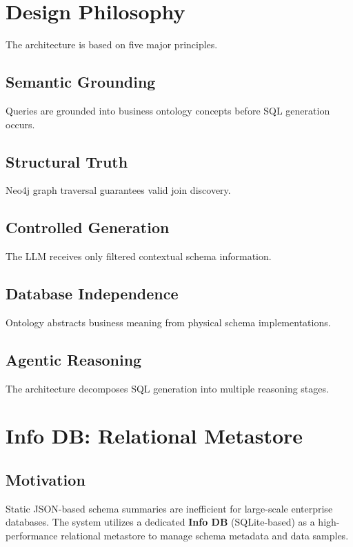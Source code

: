 \documentclass[11pt,a4paper]{article}
\begin{document}
\section{Design Philosophy}

The architecture is based on five major principles.

\subsection{Semantic Grounding}

Queries are grounded into business ontology concepts before SQL generation occurs.

\subsection{Structural Truth}

Neo4j graph traversal guarantees valid join discovery.

\subsection{Controlled Generation}

The LLM receives only filtered contextual schema information.

\subsection{Database Independence}

Ontology abstracts business meaning from physical schema implementations.

\subsection{Agentic Reasoning}

The architecture decomposes SQL generation into multiple reasoning stages.

\section{Info DB: Relational Metastore}

\subsection{Motivation}

Static JSON-based schema summaries are inefficient for large-scale enterprise databases. The system utilizes a dedicated \textbf{Info DB} (SQLite-based) as a high-performance relational metastore to manage schema metadata and data samples.
\end{document}
